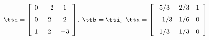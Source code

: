 {$\tta = \left[ \begin {array}{ccc} 0&-2&1 \\ \noalign{\medskip} 0&2&2 \\ \noalign{\medskip} 1&2&-3\end {array} \right] $, 
 \quad
$\ttb=\tti_3 $}
{$\ttx=\left[ \begin {array}{ccc} 5/3&2/3&1\\ \noalign{\medskip} -1/3 &1/6&0\\ \noalign{\medskip} 1/3&1/3&0  \end {array} \right] $}

